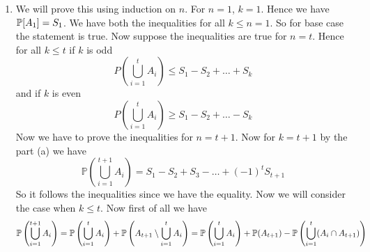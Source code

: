 \documentclass[a4paper, 11pt]{article}
\begin{document}
{\begin{enumerate}[label=(\alph*)]
%

\item We will prove this using induction on $n$. For $n=1$, $k=1$. Hence we have $\mathbb{P}[A_1]=S_1$. We have both the inequalities for all $k\leq n=1$. So for base case the statement is true. Now suppose the inequalities are true for $n=t$. Hence for all $k\leq t$ if $k$ is odd $$P\left(\bigcup_{i=1}^t A_i\right) \leq S_1-S_2+\ldots+S_k$$ and if $k$ is even $$P\left(\bigcup_{i=1}^t A_i\right) \geq S_1-S_2+\ldots-S_k$$Now we have to prove the inequalities for $n=t+1$. Now for $k=t+1$ by the part (a) we have $$\mathbb{P}\left(\bigcup_{i=1}^{t+1} A_i\right)=S_1-S_2+S_3-\ldots+(-1)^{t} S_{t+1}$$So it follows the inequalities since we have the equality. Now we will consider the case when $k\leq t$. Now first of all we have 
\begin{equation}
	\mathbb{P}\left(\bigcup_{i=1}^{t+1}A_i\right)=\mathbb{P}\left(\bigcup_{i=1}^t A_i\right)+\mathbb{P}\left(A_{t+1}\setminus\bigcup_{i=1}^t A_i\right)=\mathbb{P}\left(\bigcup_{i=1}^t A_i\right)+\mathbb{P}(A_{t+1})-\mathbb{P}\left(\bigcup_{i=1}^t (A_i\cap A_{t+1})\right)\label{eq1}
\end{equation}

\end{enumerate}}
\end{document}
